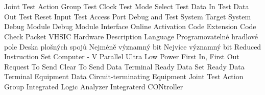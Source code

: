 \cleardoublepage
\chapter*{\listofabbrevname}
{}

\begin{acronym}[KolikMista]

		{Joint Test Action Group}
		{Test Clock}
		{Test Mode Select}
		{Test Data In}
		{Test Data Out}
		{Test Reset Input}
		{Test Access Port}
		{Debug and Test System}
		{Target System}
		{Debug Module}
		{Debug Module Interface}
		{Online Activation Code}	
		{Extension Code}
		{Check Packet}
		{VHSIC Hardware Description Language}
		{Programovatelné hradlové pole}
		{Deska plošných spojů}
		{Nejméně významný bit}
		{Nejvíce významný bit}
		{Reduced Instruction Set Computer - V}
		{Parallel Ultra Low Power}
		{First In, First Out}
		{Request To Send}
		{Clear To Send}
		{Data Terminal Ready}
		{Data Set Ready}
		{Data Terminal Equipment}
		{Data Circuit-terminating Equipment}
		{Joint Test Action Group}
		{Integrated Logic Analyzer}
		{Integraterd CONtroller}
		
\end{acronym}
